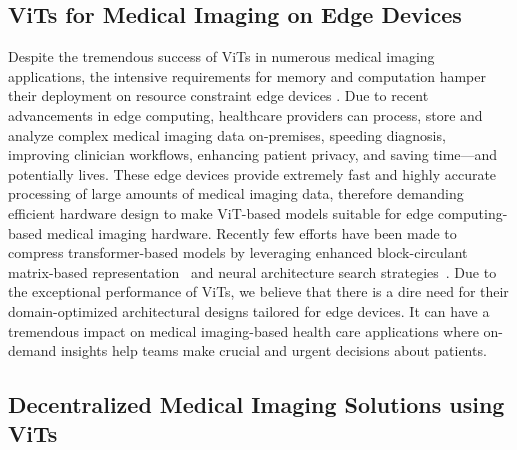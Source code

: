 \documentclass[10pt,journal,compsoc]{IEEEtran}
\begin{document}
\subsection{ViTs for Medical Imaging on Edge Devices} \label{sec:edgedevices}
Despite the tremendous success of ViTs in numerous medical imaging applications, the intensive requirements for memory and computation hamper their deployment on resource constraint edge devices \cite{zhai2021scaling,tabani2021improving}.
Due to recent advancements in edge computing, healthcare providers can process, store and analyze complex medical imaging data on-premises, speeding diagnosis, improving clinician workflows, enhancing patient privacy, and saving time—and potentially lives. These edge devices provide extremely fast and highly accurate processing of large amounts of medical imaging data, therefore demanding efficient hardware design to make ViT-based models suitable for edge computing-based medical imaging hardware. Recently few efforts have been made to compress transformer-based models by leveraging enhanced block-circulant matrix-based representation~\cite{li2020ftrans}
and neural architecture search strategies~\cite{wang2020hat}. 
Due to the exceptional performance of ViTs, we believe that there is a dire need for their domain-optimized architectural designs tailored for edge devices. It can have a tremendous impact on medical imaging-based health care applications where on-demand insights help teams make crucial and urgent decisions about patients.


\subsection{Decentralized Medical Imaging Solutions using ViTs} \label{sec:decentralized}
\end{document}
